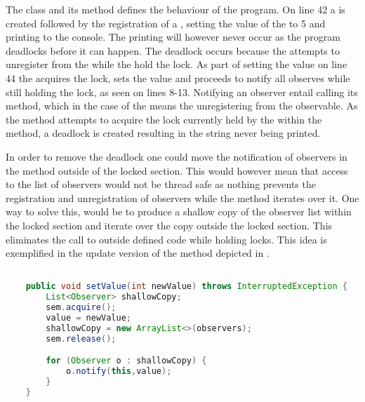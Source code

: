 The  class and its  method defines the behaviour of the program. On line 42 a  is created followed by the registration of a , setting the value of the  to 5 and printing  to the console. The printing will however never occur as the program deadlocks before it can happen. The deadlock occurs because the  attempts to unregister from the  while the  hold the lock. As part of setting the value on line 44 the  acquires the lock, sets the value and proceeds to notify all observes while still holding the lock, as seen on lines 8-13. Notifying an observer entail calling its  method, which in the case of the  means the  unregistering from the observable. As the  method attempts to acquire the lock currently held by the  within the  method, a deadlock is created resulting in the  string never being printed.

In order to remove the deadlock one could move the notification of observers in the  method outside of the locked section. This would however mean that access to the list of observers would not be thread safe as nothing prevents the registration and unregistration of observers while the  method iterates over it. One way to solve this, would be to produce a shallow copy of the observer list within the locked section and iterate over the copy outside the locked section. This eliminates the call to outside defined code while holding locks. This idea is exemplified in the update version of the  method depicted in .

\begin{lstlisting}[float,label=lst:observer_updated,
  caption={Observer pattern with locks},
  language=Java,  
  showspaces=false,
  showtabs=false,
  breaklines=true,
  showstringspaces=false,
  breakatwhitespace=true,
  commentstyle=\color{greencomments},
  keywordstyle=\color{bluekeywords},
  stringstyle=\color{redstrings}]  % Start your code-block

    public void setValue(int newValue) throws InterruptedException {
        List<Observer> shallowCopy;
        sem.acquire();
        value = newValue;
        shallowCopy = new ArrayList<>(observers);
        sem.release();

        for (Observer o : shallowCopy) {
            o.notify(this,value);
        }
    }
\end{lstlisting}


